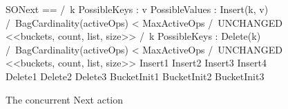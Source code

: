 \documentclass{uit-thesis}
\begin{document}
\begin{figure}
    \begin{tla}
SONext ==
    \/  /\ \E k \in PossibleKeys :
             \E v \in PossibleValues :
                Insert(k, v)
        /\ BagCardinality(activeOps) < MaxActiveOps
        /\ UNCHANGED <<buckets, count, list, size>>
    \/  /\ \E k \in PossibleKeys :
            Delete(k)
        /\ BagCardinality(activeOps) < MaxActiveOps
        /\ UNCHANGED <<buckets, count, list, size>>
    \/ Insert1
    \/ Insert2
    \/ Insert3
    \/ Insert4
    \/ Delete1
    \/ Delete2
    \/ Delete3
    \/ BucketInit1
    \/ BucketInit2
    \/ BucketInit3
    \end{tla}
\begin{tlatex}
%
%
%
%
%
%
%
%
%
%
%
%
%
%
%
%
%
%
\end{tlatex}
    \caption{The concurrent Next action}
    \label{fig:concurrent-next}
\end{figure}
\end{document}
